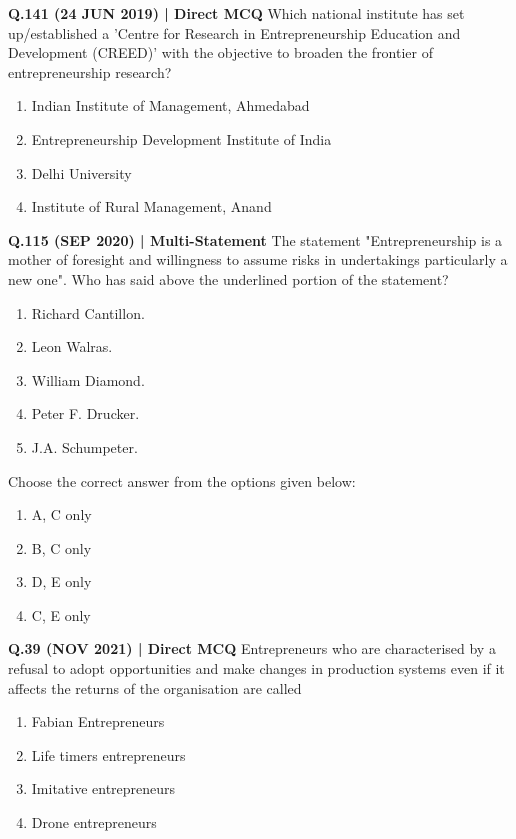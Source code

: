 \documentclass{article}
\begin{document}
\textbf{Q.141 (24 JUN 2019) | Direct MCQ}
Which national institute has set up/established a 'Centre for Research in Entrepreneurship Education and Development (CREED)' with the objective to broaden the frontier of entrepreneurship research?
\begin{enumerate}[label=(\arabic*)]
    \item Indian Institute of Management, Ahmedabad
    \item Entrepreneurship Development Institute of India
    \item Delhi University
    \item Institute of Rural Management, Anand
\end{enumerate}

\textbf{Q.115 (SEP 2020) | Multi-Statement}
The statement "Entrepreneurship is a mother of foresight and willingness to assume risks in undertakings particularly a new one". Who has said above the underlined portion of the statement?
\begin{enumerate}[label=\Alph*.]
    \item Richard Cantillon.
    \item Leon Walras.
    \item William Diamond.
    \item Peter F. Drucker.
    \item J.A. Schumpeter.
\end{enumerate}
Choose the correct answer from the options given below:
\begin{enumerate}[label=(\arabic*)]
    \item A, C only
    \item B, C only
    \item D, E only
    \item C, E only
\end{enumerate}

\textbf{Q.39 (NOV 2021) | Direct MCQ}
Entrepreneurs who are characterised by a refusal to adopt opportunities and make changes in production systems even if it affects the returns of the organisation are called
\begin{enumerate}[label=(\arabic*)]
    \item Fabian Entrepreneurs
    \item Life timers entrepreneurs
    \item Imitative entrepreneurs
    \item Drone entrepreneurs
\end{enumerate}
\end{document}
